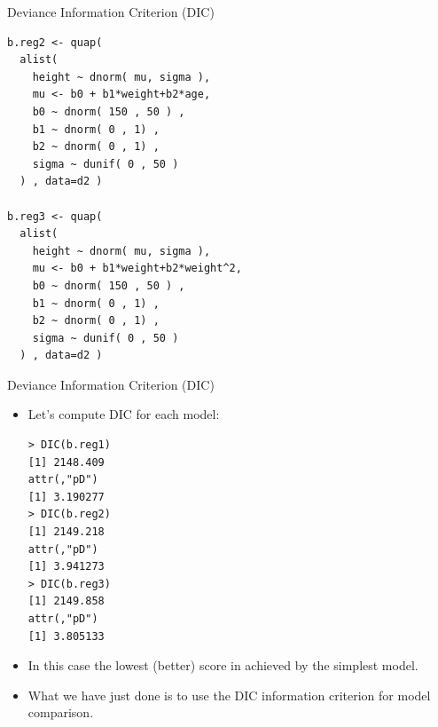 \documentclass[handout]{beamer}
\begin{document}
\begin{frame}[fragile]{Deviance Information Criterion (DIC)}
\scriptsize{

\begin{verbatim}
b.reg2 <- quap(
  alist(
    height ~ dnorm( mu, sigma ),
    mu <- b0 + b1*weight+b2*age,
    b0 ~ dnorm( 150 , 50 ) ,
    b1 ~ dnorm( 0 , 1) ,
    b2 ~ dnorm( 0 , 1) ,
    sigma ~ dunif( 0 , 50 )
  ) , data=d2 )

b.reg3 <- quap(
  alist(
    height ~ dnorm( mu, sigma ),
    mu <- b0 + b1*weight+b2*weight^2,
    b0 ~ dnorm( 150 , 50 ) ,
    b1 ~ dnorm( 0 , 1) ,
    b2 ~ dnorm( 0 , 1) ,
    sigma ~ dunif( 0 , 50 )
  ) , data=d2 )
\end{verbatim}






} 
\end{frame}


\begin{frame}[fragile]{Deviance Information Criterion (DIC)}
\scriptsize{


\begin{itemize}
\item Let's compute DIC for each model: 

\begin{verbatim}
> DIC(b.reg1)
[1] 2148.409
attr(,"pD")
[1] 3.190277
> DIC(b.reg2)
[1] 2149.218
attr(,"pD")
[1] 3.941273
> DIC(b.reg3)
[1] 2149.858
attr(,"pD")
[1] 3.805133
\end{verbatim}


\item In this case the lowest (better) score in achieved by the simplest model.

\item What we have just done is to use the DIC information criterion for model comparison.


\end{itemize}


} 
\end{frame}
\end{document}
